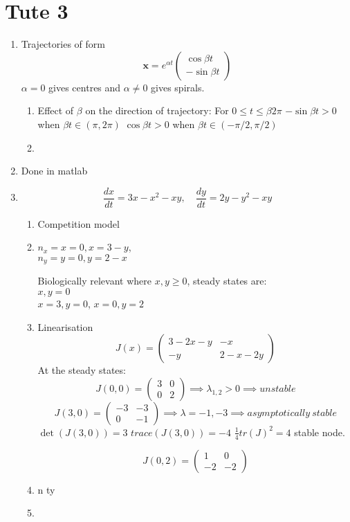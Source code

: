 \documentclass{/home/janmebows/Documents/LatexTemplates/myassignment}
\begin{document}
\section{Tute 3}
\begin{enumerate}
    \item Trajectories of form
    \[\mathbf{x} = e^{\alpha t}\begin{pmatrix}
        \cos \beta t\\ -\sin \beta t

    \end{pmatrix}\]
    $\alpha= 0$ gives centres and $\alpha\neq 0$ gives spirals. 
    \begin{enumerate}
        \item Effect of $\beta$ on the direction of trajectory: For $0\leq t \leq \beta 2\pi $
        $-\sin \beta t > 0$ when $\beta t \in (\pi, 2 \pi)$
        $\cos \beta t > 0$ when $\beta t \in (-\pi/2,\pi/2)$
        \item 
    \end{enumerate}
    \item Done in matlab
    \item 
    \[\frac{dx}{dt} = 3x - x^2 - xy, \quad \frac{dy}{dt} = 2y - y^2 - xy\]
    \begin{enumerate}
        \item Competition model
        \item $n_x = x=0, x = 3-y$, \\
        $n_y = y = 0, y = 2-x$

        Biologically relevant where $x,y \geq 0 $, steady states are:\\
        $x,y=0$\\
        $x = 3, y = 0$,
        $x = 0, y = 2$
        \item Linearisation
        \[J(x) = \begin{pmatrix}
            3 - 2x -y & -x\\ -y & 2-x - 2y
        \end{pmatrix}\]
At the steady states: 
\[J(0,0) = \begin{pmatrix}
    3&0\\0&2
\end{pmatrix} \implies \lambda_{1,2} > 0\implies unstable\]
\[J(3,0) = \begin{pmatrix}
    -3&-3\\ 0 & -1
\end{pmatrix} \implies \lambda = -1,-3 \implies  asymptotically\ stable\]
$\det(J(3,0)) = 3$ $trace(J(3,0)) = -4$
$\frac14 tr(J)^2 = 4$ stable node.



\[J(0,2) = \begin{pmatrix}
    1&0\\-2&-2
\end{pmatrix}\]



        \item n ty
        \item 
    \end{enumerate}


\end{enumerate}
\end{document}
